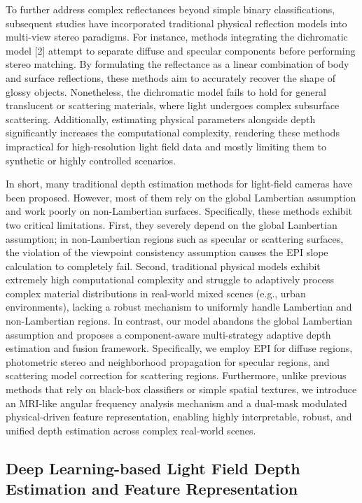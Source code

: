 To further address complex reflectances beyond simple binary classifications, subsequent studies have incorporated traditional physical reflection models into multi-view stereo paradigms. For instance, methods integrating the dichromatic model [2] attempt to separate diffuse and specular components before performing stereo matching. By formulating the reflectance as a linear combination of body and surface reflections, these methods aim to accurately recover the shape of glossy objects. Nonetheless, the dichromatic model fails to hold for general translucent or scattering materials, where light undergoes complex subsurface scattering. Additionally, estimating physical parameters alongside depth significantly increases the computational complexity, rendering these methods impractical for high-resolution light field data and mostly limiting them to synthetic or highly controlled scenarios.

In short, many traditional depth estimation methods for light-field cameras have been proposed. However, most of them rely on the global Lambertian assumption and work poorly on non-Lambertian surfaces. Specifically, these methods exhibit two critical limitations. First, they severely depend on the global Lambertian assumption; in non-Lambertian regions such as specular or scattering surfaces, the violation of the viewpoint consistency assumption causes the EPI slope calculation to completely fail. Second, traditional physical models exhibit extremely high computational complexity and struggle to adaptively process complex material distributions in real-world mixed scenes (e.g., urban environments), lacking a robust mechanism to uniformly handle Lambertian and non-Lambertian regions. In contrast, our model abandons the global Lambertian assumption and proposes a component-aware multi-strategy adaptive depth estimation and fusion framework. Specifically, we employ EPI for diffuse regions, photometric stereo and neighborhood propagation for specular regions, and scattering model correction for scattering regions. Furthermore, unlike previous methods that rely on black-box classifiers or simple spatial textures, we introduce an MRI-like angular frequency analysis mechanism and a dual-mask modulated physical-driven feature representation, enabling highly interpretable, robust, and unified depth estimation across complex real-world scenes.

\subsection{Deep Learning-based Light Field Depth Estimation and Feature Representation}

